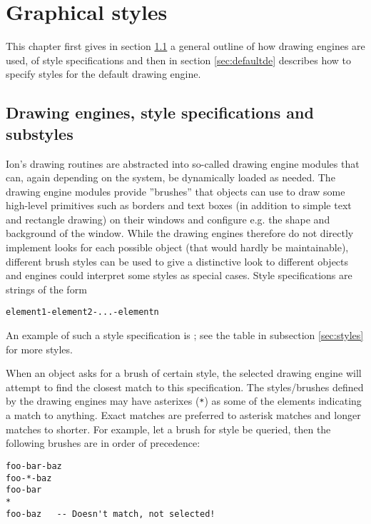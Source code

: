
\chapter{Graphical styles}

This chapter first gives in section \ref{sec:engines} a general outline 
of how drawing engines are used, of style specifications and then
in section \ref{sec:defaultde} describes how to specify styles
for the default drawing engine.

\section{Drawing engines, style specifications and substyles}
\label{sec:engines}

Ion's drawing routines are abstracted into so-called drawing engine
modules that can, again depending on the system, be dynamically
loaded as needed. The drawing engine modules provide ''brushes''
that objects can use to draw some high-level primitives such
as borders and text boxes (in addition to simple text and rectangle
drawing) on their windows and configure e.g. the shape and 
background of the window. While the drawing engines therefore
do not directly implement looks for each possible object (that
would hardly be maintainable), different brush styles can be
used to give a distinctive look to different objects and engines
could interpret some styles as special cases. Style specifications 
are strings of the form

\begin{verbatim}
element1-element2-...-elementn
\end{verbatim}

An example of such a style specification is ;
see the table in subsection \ref{sec:styles} for more styles.

When an object asks for a brush of certain style, the selected
drawing engine will attempt to find the closest match to this
specification. The styles/brushes defined by the drawing engines 
may have asterixes (\verb!*!) as some of the elements indicating
a match to anything. Exact matches are preferred to asterisk
matches and longer matches to shorter. For example, let a brush
for style  be queried, then the following
brushes are in order of precedence:

\begin{verbatim}
foo-bar-baz
foo-*-baz
foo-bar
*
foo-baz   -- Doesn't match, not selected!
\end{verbatim}

